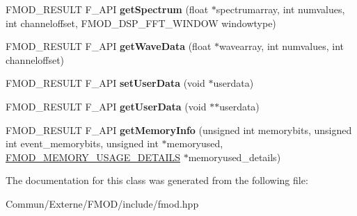 \begin{DoxyCompactItemize}
\item 
F\+M\+O\+D\+\_\+\+R\+E\+S\+U\+LT F\+\_\+\+A\+PI {\bfseries get\+Spectrum} (float $\ast$spectrumarray, int numvalues, int channeloffset, F\+M\+O\+D\+\_\+\+D\+S\+P\+\_\+\+F\+F\+T\+\_\+\+W\+I\+N\+D\+OW windowtype)\hypertarget{class_f_m_o_d_1_1_channel_group_a8ee0bad7f2c729641b5d61f2f2aff135}{}\label{class_f_m_o_d_1_1_channel_group_a8ee0bad7f2c729641b5d61f2f2aff135}

\item 
F\+M\+O\+D\+\_\+\+R\+E\+S\+U\+LT F\+\_\+\+A\+PI {\bfseries get\+Wave\+Data} (float $\ast$wavearray, int numvalues, int channeloffset)\hypertarget{class_f_m_o_d_1_1_channel_group_a8d632fabc33cc9f67e528c76489c9172}{}\label{class_f_m_o_d_1_1_channel_group_a8d632fabc33cc9f67e528c76489c9172}

\item 
F\+M\+O\+D\+\_\+\+R\+E\+S\+U\+LT F\+\_\+\+A\+PI {\bfseries set\+User\+Data} (void $\ast$userdata)\hypertarget{class_f_m_o_d_1_1_channel_group_a0a71472fd896173cae99c4d2c42743df}{}\label{class_f_m_o_d_1_1_channel_group_a0a71472fd896173cae99c4d2c42743df}

\item 
F\+M\+O\+D\+\_\+\+R\+E\+S\+U\+LT F\+\_\+\+A\+PI {\bfseries get\+User\+Data} (void $\ast$$\ast$userdata)\hypertarget{class_f_m_o_d_1_1_channel_group_a347e86f79b6679e20b4515846644e8a4}{}\label{class_f_m_o_d_1_1_channel_group_a347e86f79b6679e20b4515846644e8a4}

\item 
F\+M\+O\+D\+\_\+\+R\+E\+S\+U\+LT F\+\_\+\+A\+PI {\bfseries get\+Memory\+Info} (unsigned int memorybits, unsigned int event\+\_\+memorybits, unsigned int $\ast$memoryused, \hyperlink{struct_f_m_o_d___m_e_m_o_r_y___u_s_a_g_e___d_e_t_a_i_l_s}{F\+M\+O\+D\+\_\+\+M\+E\+M\+O\+R\+Y\+\_\+\+U\+S\+A\+G\+E\+\_\+\+D\+E\+T\+A\+I\+LS} $\ast$memoryused\+\_\+details)\hypertarget{class_f_m_o_d_1_1_channel_group_a8483ad1631034c7be3fdcf0a9633bbb7}{}\label{class_f_m_o_d_1_1_channel_group_a8483ad1631034c7be3fdcf0a9633bbb7}

\end{DoxyCompactItemize}


The documentation for this class was generated from the following file\+:\begin{DoxyCompactItemize}
\item 
Commun/\+Externe/\+F\+M\+O\+D/include/fmod.\+hpp\end{DoxyCompactItemize}
